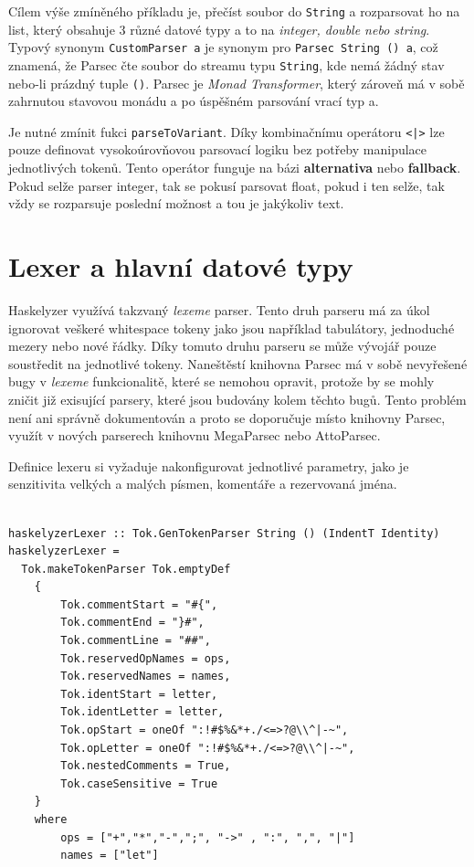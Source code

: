 \documentclass[male,czech]{kithesis}
\newcommand{\haskellInline}[1]{\colorbox{gray!10}{\texttt{#1}}}
\begin{document}
Cílem výše zmíněného příkladu je, 
přečíst soubor do \haskellInline{String} 
a rozparsovat ho na list, 
který obsahuje 3 různé datové typy 
a to na \textit{integer, double nebo string}.
Typový synonym \haskellInline{CustomParser a} 
je synonym pro \haskellInline{Parsec String () a},
což znamená, 
že Parsec čte soubor do streamu typu \haskellInline{String}, 
kde nemá žádný stav nebo-li prázdný tuple \haskellInline{()}. 
Parsec je \textit{Monad Transformer},
který zároveň má v sobě zahrnutou stavovou monádu a 
po úspěšném parsování vrací typ a. 

Je nutné zmínit fukci \haskellInline{parseToVariant}. 
Díky kombinačnímu operátoru \haskellInline{<|>} 
lze pouze definovat vysokoúrovňovou parsovací logiku bez potřeby manipulace jednotlivých tokenů. 
Tento operátor funguje na bázi \textbf{alternativa} nebo
\textbf{fallback}. 
Pokud selže parser integer, 
tak se pokusí parsovat float, 
pokud i ten selže, 
tak vždy se rozparsuje poslední možnost a 
tou je jakýkoliv text.

\section{Lexer a hlavní datové typy}

Haskelyzer využívá takzvaný \textit{lexeme} parser.
Tento druh parseru má za úkol ignorovat veškeré whitespace tokeny jako
jsou například tabulátory, 
jednoduché mezery nebo nové řádky.
Díky tomuto druhu parseru se může vývojář pouze soustředit na 
jednotlivé tokeny. 
Naneštěstí knihovna Parsec má v sobě nevyřešené bugy v \textit{lexeme} funkcionalitě, 
které se nemohou opravit, 
protože by se mohly zničit již exisující parsery,
které jsou budovány kolem těchto bugů.
Tento problém není ani správně dokumentován a proto 
se doporučuje místo knihovny Parsec, 
využít v nových parserech knihovnu MegaParsec nebo AttoParsec. 

Definice lexeru si vyžaduje nakonfigurovat jednotlivé parametry,
jako je senzitivita velkých a malých písmen, 
komentáře a rezervovaná jména.

\begin{verbatim}

haskelyzerLexer :: Tok.GenTokenParser String () (IndentT Identity)
haskelyzerLexer =
  Tok.makeTokenParser Tok.emptyDef 
    { 
        Tok.commentStart = "#{",
        Tok.commentEnd = "}#",
        Tok.commentLine = "##",
        Tok.reservedOpNames = ops,
        Tok.reservedNames = names,
        Tok.identStart = letter,
        Tok.identLetter = letter,
        Tok.opStart = oneOf ":!#$%&*+./<=>?@\\^|-~",
        Tok.opLetter = oneOf ":!#$%&*+./<=>?@\\^|-~",
        Tok.nestedComments = True,
        Tok.caseSensitive = True
    }
    where
        ops = ["+","*","-",";", "->" , ":", ",", "|"]
        names = ["let"]

\end{verbatim}
\end{document}
